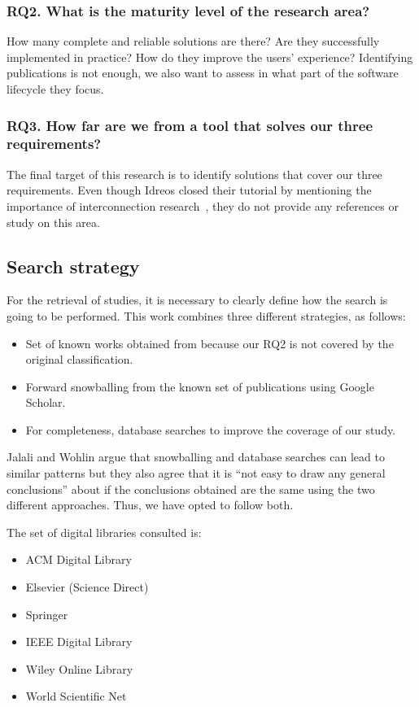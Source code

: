 \subsubsection{RQ2. What is the maturity level of the research area?}
How many complete and reliable solutions are there?
Are they successfully implemented in practice?
How do they improve the users' experience? Identifying publications is not enough,
we also want to assess in what part of the software lifecycle they focus.

\subsubsection{RQ3. How far are we from a tool that solves our three requirements?}
The final target of this research is to identify solutions that cover our three
requirements.
Even though Idreos closed their tutorial by
mentioning the importance of interconnection research~\cite{Idreos2015}, they do not provide
any references or study on this area.

\subsection{Search strategy}
\label{sec:mapping/search_strategy}

For the retrieval of studies, it is necessary to clearly define
how the search is going to be performed. This work combines
three different strategies, as follows:

\begin{itemize}
  \item Set of known works obtained from \cite{Idreos2015} because our RQ2 is
    not covered by the original classification.
  \item Forward snowballing\cite{Webster2002} from the known set of publications using Google Scholar.
  \item For completeness, database searches to improve the coverage of our study.
\end{itemize}

Jalali and Wohlin\cite{Jalali2012} argue that snowballing and database searches
can lead to similar patterns but they also agree that it is
``not easy to draw any general conclusions'' about if the conclusions obtained are the same
using the two different approaches. Thus, we have opted to follow both.

The set of digital libraries consulted is:

\begin{itemize}
  \item ACM Digital Library
  \item Elsevier (Science Direct)
  \item Springer
  \item IEEE Digital Library
  \item Wiley Online Library
  \item World Scientific Net
\end{itemize}

